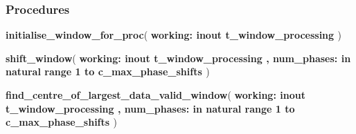 \subsubsection*{Procedures}
 \begin{DoxyCompactItemize}
\item 
{\bfseries {\bfseries \textcolor{vhdlchar}{ }}} {\bf initialise\+\_\+window\+\_\+for\+\_\+proc}( {\bfseries \textcolor{vhdlchar}{ }\textcolor{vhdlchar}{working\+: }\textcolor{stringliteral}{} {\bfseries \textcolor{keywordflow}{inout}\textcolor{vhdlchar}{ }{\bfseries {\bf t\+\_\+window\+\_\+processing}} \textcolor{vhdlchar}{ }}} )
\item 
{\bfseries {\bfseries \textcolor{vhdlchar}{ }}} {\bf shift\+\_\+window}( {\bfseries \textcolor{vhdlchar}{ }\textcolor{vhdlchar}{working\+: }\textcolor{stringliteral}{} {\bfseries \textcolor{keywordflow}{inout}\textcolor{vhdlchar}{ }{\bfseries {\bf t\+\_\+window\+\_\+processing}} \textcolor{vhdlchar}{ }}}{\bfseries ,\textcolor{vhdlchar}{ }\textcolor{vhdlchar}{num\+\_\+phases\+: }\textcolor{stringliteral}{} {\bfseries \textcolor{keywordflow}{in}\textcolor{vhdlchar}{ }\textcolor{comment}{natural}\textcolor{vhdlchar}{ }\textcolor{vhdlchar}{ }\textcolor{vhdlchar}{ }\textcolor{keywordflow}{range}\textcolor{vhdlchar}{ }\textcolor{vhdlchar}{ } \textcolor{vhdldigit}{1} \textcolor{vhdlchar}{ }\textcolor{keywordflow}{to}\textcolor{vhdlchar}{ }\textcolor{vhdlchar}{ }\textcolor{vhdlchar}{ }\textcolor{vhdlchar}{ }{\bfseries {\bf c\+\_\+max\+\_\+phase\+\_\+shifts}} \textcolor{vhdlchar}{ }}} )
\item 
{\bfseries {\bfseries \textcolor{vhdlchar}{ }}} {\bf find\+\_\+centre\+\_\+of\+\_\+largest\+\_\+data\+\_\+valid\+\_\+window}( {\bfseries \textcolor{vhdlchar}{ }\textcolor{vhdlchar}{working\+: }\textcolor{stringliteral}{} {\bfseries \textcolor{keywordflow}{inout}\textcolor{vhdlchar}{ }{\bfseries {\bf t\+\_\+window\+\_\+processing}} \textcolor{vhdlchar}{ }}}{\bfseries ,\textcolor{vhdlchar}{ }\textcolor{vhdlchar}{num\+\_\+phases\+: }\textcolor{stringliteral}{} {\bfseries \textcolor{keywordflow}{in}\textcolor{vhdlchar}{ }\textcolor{comment}{natural}\textcolor{vhdlchar}{ }\textcolor{vhdlchar}{ }\textcolor{vhdlchar}{ }\textcolor{keywordflow}{range}\textcolor{vhdlchar}{ }\textcolor{vhdlchar}{ } \textcolor{vhdldigit}{1} \textcolor{vhdlchar}{ }\textcolor{keywordflow}{to}\textcolor{vhdlchar}{ }\textcolor{vhdlchar}{ }\textcolor{vhdlchar}{ }\textcolor{vhdlchar}{ }{\bfseries {\bf c\+\_\+max\+\_\+phase\+\_\+shifts}} \textcolor{vhdlchar}{ }}} )
\item 

\end{DoxyCompactItemize}
